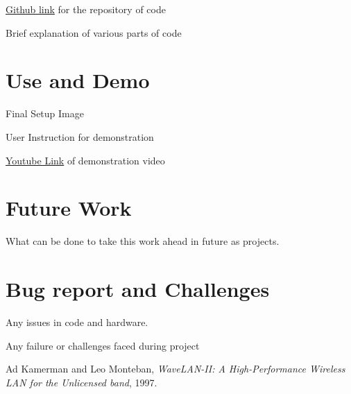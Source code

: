 \documentclass[a4paper,12pt,oneside]{book}
\begin{document}
\href{http://www.github.com}{Github link} for the repository of code

Brief explanation of various parts of code 

\section{Use and Demo}
Final Setup Image

User Instruction for demonstration

\href{http://www.youtube.com}{Youtube Link} of demonstration video 

\section{Future Work}
What can be done to take this work ahead in future as projects.

\section{Bug report and Challenges}
Any issues in code and hardware.

Any failure or challenges faced during project

\begin{thebibliography}{li}
Ad Kamerman and Leo Monteban,
{\em WaveLAN-II: A High-Performance Wireless LAN for the Unlicensed band},
1997.

\end{thebibliography}
\end{document}
